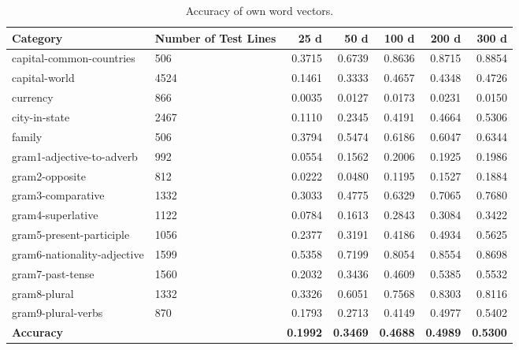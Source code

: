 \begin{table}
\begin{tabular}{l|R{2.5cm}|r|r|r|r|r}
\hline
\textbf{Category}	             & \textbf{Number of Test Lines}	& \textbf{25 d}	  & \textbf{50 d}	  & \textbf{100 d} 	& \textbf{200 d}	  & \textbf{300 d} \\
\hline\hline
capital-common-countries	     & 506	                          & 0.3715	        & 0.6739 	        & 0.8636	& 0.8715	& 0.8854\\ \hline
capital-world	                 & 4524	                          & 0.1461	        & 0.3333 	        & 0.4657	& 0.4348	& 0.4726\\ \hline
currency	                     & 866	                          & 0.0035	        & 0.0127 	        & 0.0173	& 0.0231	& 0.0150\\ \hline
city-in-state	                 & 2467	                          & 0.1110	        & 0.2345 	        & 0.4191	& 0.4664	& 0.5306\\ \hline
family	                       & 506	                          & 0.3794	        & 0.5474 	        & 0.6186	& 0.6047	& 0.6344\\ \hline
gram1-adjective-to-adverb	     & 992	                          & 0.0554	        & 0.1562 	        & 0.2006	& 0.1925	& 0.1986\\ \hline
gram2-opposite	               & 812	                          & 0.0222	        & 0.0480 	        & 0.1195	& 0.1527	& 0.1884\\ \hline
gram3-comparative	             & 1332	                          & 0.3033	        & 0.4775 	        & 0.6329	& 0.7065	& 0.7680\\ \hline
gram4-superlative	             & 1122	                          & 0.0784	        & 0.1613 	        & 0.2843	& 0.3084	& 0.3422\\ \hline
gram5-present-participle	     & 1056	                          & 0.2377	        & 0.3191 	        & 0.4186	& 0.4934	& 0.5625\\ \hline
gram6-nationality-adjective	   & 1599	                          & 0.5358	        & 0.7199 	        & 0.8054	& 0.8554	& 0.8698\\ \hline
gram7-past-tense	             & 1560	                          & 0.2032	        & 0.3436 	        & 0.4609	& 0.5385	& 0.5532\\ \hline
gram8-plural	                 & 1332	                          & 0.3326	        & 0.6051 	        & 0.7568	& 0.8303	& 0.8116\\ \hline
gram9-plural-verbs	           & 870	                          & 0.1793	        & 0.2713 	        & 0.4149	& 0.4977	& 0.5402\\ \hline
\textbf{Accuracy} & & \textbf{0.1992} & \textbf{0.3469} & \textbf{0.4688} & \textbf{0.4989}	& \textbf{0.5300}\\ \hline
\end{tabular}
\caption{Accuracy of own word vectors.}
\end{table}

